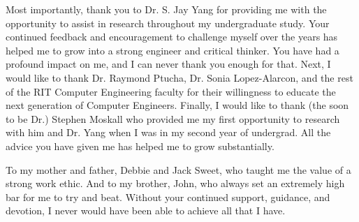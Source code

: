 %
%
%


\frontmatter


\begin{acknowledgments}
	\vfill
	\begin{center}
		\indent Most importantly, thank you to Dr. S. Jay Yang for providing me with the opportunity to assist in research throughout my undergraduate study. Your continued feedback and encouragement to challenge myself over the years has helped me to grow into a strong engineer and critical thinker. You have had a profound impact on me, and I can never thank you enough for that. Next, I would like to thank Dr. Raymond Ptucha, Dr. Sonia Lopez-Alarcon, and the rest of the RIT Computer Engineering faculty for their willingness to educate the next generation of Computer Engineers. Finally, I would like to thank (the soon to be Dr.) Stephen Moskall who provided me my first opportunity to research with him and Dr. Yang when I was in my second year of undergrad. All the advice you have given me has helped me to grow substantially. 
	\end{center}
	\vfill
\end{acknowledgments}


\begin{dedication}
	\vfill
	\begin{center}
		To my mother and father, Debbie and Jack Sweet, who taught me the value of a strong work ethic. And to my brother, John, who always set an extremely high bar for me to try and beat. Without your continued support, guidance, and devotion, I never would have been able to achieve all that I have. 
	\end{center}
	\vfill
\end{dedication}

